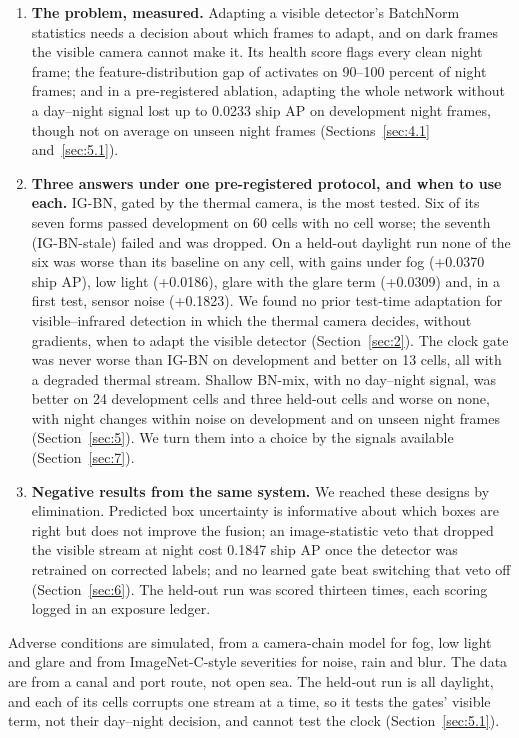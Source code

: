 \documentclass[journal]{IEEEtran}
\begin{document}
\begin{enumerate}
\item \textbf{The problem, measured.} Adapting a visible detector's BatchNorm statistics needs a decision about which frames to adapt, and on dark frames the visible camera cannot make it. Its health score flags every clean night frame; the feature-distribution gap of \citet{yoo2024what} activates on 90--100 percent of night frames; and in a pre-registered ablation, adapting the whole network without a day--night signal lost up to 0.0233 ship AP on development night frames, though not on average on unseen night frames (Sections~\ref{sec:4.1} and~\ref{sec:5.1}).
\item \textbf{Three answers under one pre-registered protocol, and when to use each.} \mbox{IG-BN}, gated by the thermal camera, is the most tested. Six of its seven forms passed development on 60 cells with no cell worse; the seventh (\mbox{IG-BN-stale}) failed and was dropped. On a held-out daylight run none of the six was worse than its baseline on any cell, with gains under fog (+0.0370 ship AP), low light (+0.0186), glare with the glare term (+0.0309) and, in a first test, sensor noise (+0.1823). We found no prior test-time adaptation for visible--infrared detection in which the thermal camera decides, without gradients, when to adapt the visible detector (Section~\ref{sec:2}). The clock gate was never worse than \mbox{IG-BN} on development and better on 13 cells, all with a degraded thermal stream. Shallow BN-mix, with no day--night signal, was better on 24 development cells and three held-out cells and worse on none, with night changes within noise on development and on unseen night frames (Section~\ref{sec:5}). We turn them into a choice by the signals available (Section~\ref{sec:7}).
\item \textbf{Negative results from the same system.} We reached these designs by elimination. Predicted box uncertainty is informative about which boxes are right but does not improve the fusion; an image-statistic veto that dropped the visible stream at night cost 0.1847 ship AP once the detector was retrained on corrected labels; and no learned gate beat switching that veto off (Section~\ref{sec:6}). The held-out run was scored thirteen times, each scoring logged in an exposure ledger.
\end{enumerate}

Adverse conditions are simulated, from a camera-chain model for fog, low light and glare and from ImageNet-C-style severities for noise, rain and blur. The data are from a canal and port route, not open sea. The held-out run is all daylight, and each of its cells corrupts one stream at a time, so it tests the gates' visible term, not their day--night decision, and cannot test the clock (Section~\ref{sec:5.1}).
\end{document}
